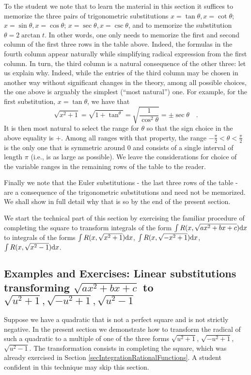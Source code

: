 \documentclass[12pt]{book}
\begin{document}
To the student we note that to learn the material in this section it suffices to memorize the three pairs of trigonometric substitutions $x=\tan \theta, x= \cot \theta$; $x=\sin \theta, x= \cos \theta$; $x=\sec \theta, x=\csc \theta$, and to memorize the substitution $\theta=2\arctan t$. In other words, one only needs to memorize the first and second column of the first three rows in the table above. Indeed, the formulas in the fourth column appear naturally while simplifying radical expression from the first column. In turn, the third column is a natural consequence of the other three: let us explain why. Indeed, while the entries of the third column may be chosen in another way without significant changes in the theory, among all possible choices, the one above is arguably the simplest (``most natural'') one. For example, for the first substitution, $x=\tan \theta$, we have that
\[
\sqrt{x^2+1}= \sqrt{ 1+\tan^\theta}= \sqrt{\frac{1}{\cos^2 \theta}}=\pm \sec \theta\quad .
\]
It is then most natural to select the range for $\theta$ so that the sign choice in the above equality is $+$. Among all ranges with that property, the range $-\frac{\pi }{2}< \theta < \frac{\pi }{2}$ is the only one that is symmetric around $0$ and consists of a single interval of length $\pi$ (i.e., is as large as possible). We leave the considerations for choice of the variable ranges in the remaining rows of the table to the reader.

Finally we note that the Euler substitutions - the last three rows of the table - are a consequence of the trigonometric substitutions and need not be memorized. We shall show in full detail why that is so by the end of the present section.

We start the technical part of this section by exercising the familiar procedure of completing the square to transform integrals of the form $\int R(x,\sqrt{ax^2+bx+c}) {\normalfont \text{d}} x$ to integrals of the forms $\int R(x, \sqrt{x^2+1}){\normalfont \text{d}} x$,  $\int R(x, \sqrt{-x^2+1}){\normalfont \text{d}} x$, $\int R(x, \sqrt{x^2-1}){\normalfont \text{d}} x$.
\subsection[Transforming radicals of quadratics to basic form]{Examples and Exercises: Linear substitutions transforming $\displaystyle \sqrt{ax^2+bx+c}$ to $\displaystyle \sqrt{u^2+1}, \sqrt{-u^2 +1}, \sqrt{u^2-1} $} \label{secEulerIntegralsAndLinearSubstitutions}
Suppose we have a quadratic that is not a perfect square and is not strictly negative. In the present section we demonstrate how to transform the radical of such a quadratic to a multiple of one of the three forms $\sqrt{u^2+1}$, $\sqrt{-u^2 +1}$, $\sqrt{u^2-1} $. The transformation consists in completing the square, which was already exercised in Section \ref{secIntegrationRationalFunctions}. A student confident in this technique may skip this section.
\end{document}
